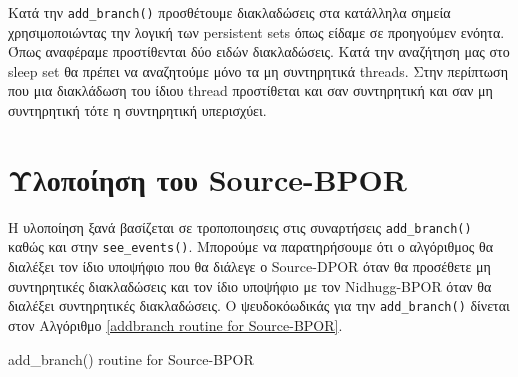 Κατά την \verb|add_branch()| προσθέτουμε διακλαδώσεις στα κατάλληλα σημεία
χρησιμοποιώντας την λογική των persistent sets όπως είδαμε σε προηγούμεν ενόητα.
Όπως αναφέραμε προστίθενται δύο ειδών διακλαδώσεις. Κατά την αναζήτηση μας στο sleep set θα πρέπει να αναζητούμε 
μόνο τα μη συντηρητικά threads. Στην περίπτωση που μια διακλάδωση του ίδιου thread προστίθεται και σαν συντηρητική και σαν
μη συντηρητική τότε η συντηρητική υπερισχύει.

\section{Υλοποίηση του Source-BPOR}

Η υλοποίηση ξανά βασίζεται σε τροποποιησεις στις συναρτήσεις \verb|add_branch()| καθώς και στην
\verb|see_events()|.  Μπορούμε να παρατηρήσουμε ότι ο αλγόριθμος θα διαλέξει τον ίδιο υποψήφιο που θα διάλεγε ο Source-DPOR 
όταν θα προσέθετε μη συντηρητικές διακλαδώσεις και τον ίδιο υποψήφιο με τον Nidhugg-BPOR όταν θα διαλέξει συντηρητικές διακλαδώσεις.
Ο ψευδοκόωδικάς για την 
\verb|add_branch()| δίνεται στον Αλγόριθμο \ref{addbranch routine for Source-BPOR}.

\begin{algorithm}[H]
    \caption{add\_branch() routine for Source-BPOR}
    \label{addbranch routine for Source-BPOR}
\end{algorithm}
